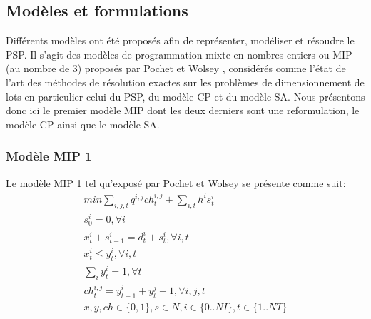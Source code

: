\documentclass[12pt,a4paper]{article}
\begin{document}
		\subsection{Modèles et formulations}
		Différents modèles ont été proposés afin de représenter, modéliser et résoudre le PSP. Il s'agit des modèles de programmation mixte en nombres entiers ou MIP (au nombre de 3) proposés par Pochet et Wolsey \cite{pochet_wolsey}, considérés comme l'état de l'art des méthodes de résolution exactes sur les problèmes de dimensionnement de lots en particulier celui du PSP, du modèle CP et du modèle SA. Nous présentons donc ici le premier modèle MIP dont les deux derniers sont une reformulation, le modèle CP ainsi que le modèle SA.
		\subsubsection{Modèle MIP 1}
		
		Le modèle MIP 1 tel qu'exposé par Pochet et Wolsey se présente comme suit:
		\begin{eqnarray}
			min \sum_{i,j,t} q^{i,j}ch_{t}^{i,j} + \sum_{i,t} h^{i} s_{t}^{i} \\
			s_{0}^{i} = 0, \forall i \\
			x_{t}^{i} + s_{t-1}^{i} = d_{t}^{i} + s_{t}^{i}, \forall i,t \\
			x_{t}^{i} \leq y_{t}^{i}, \forall i,t \\
			\sum_{i} y_{t}^{i} = 1 , \forall t \\
			ch_{t}^{i,j} = y_{t-1}^{i} + y_{t}^{j} - 1, \forall i,j,t \\
			x,y,ch \in \{0,1\}, s \in N, i \in \{0..NI\}, t \in \{1..NT\}
		\end{eqnarray}
		
\end{document}
